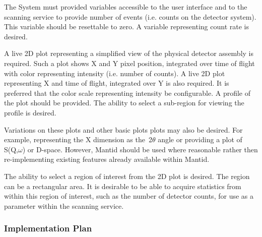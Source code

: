 The System must provided variables accessible to the user interface and
to the scanning service to provide number of events (i.e. counts on the
detector system). This variable should be resettable to zero. A variable
representing count rate is desired.

A live 2D plot representing a simplified view of the physical detector
assembly is required.  Such a plot shows X and Y pixel position,
integrated over time of flight with color representing intensity
(i.e. number of counts).  A live 2D plot representing X and time of
flight, integrated over Y is also required.  It is preferred that the
color scale representing intensity be configurable.  A profile of the
plot should be provided. The ability to select a sub-region for viewing
the profile is desired.

Variations on these plots and other basic plots plots may also be
desired. For example, representing the X dimension as the~2$\theta$
angle or providing a plot of S(Q,$\omega$) or D-space. However, Mantid
should be used where reasonable rather then re-implementing existing
features already available within Mantid.

The ability to select a region of interest from the 2D plot is desired.
The region can be a rectangular area. It is desirable to be able to
acquire statistics from within this region of interest, such as the number
of detector counts, for use as a parameter within the scanning service.

\subsubsection{Implementation Plan}

